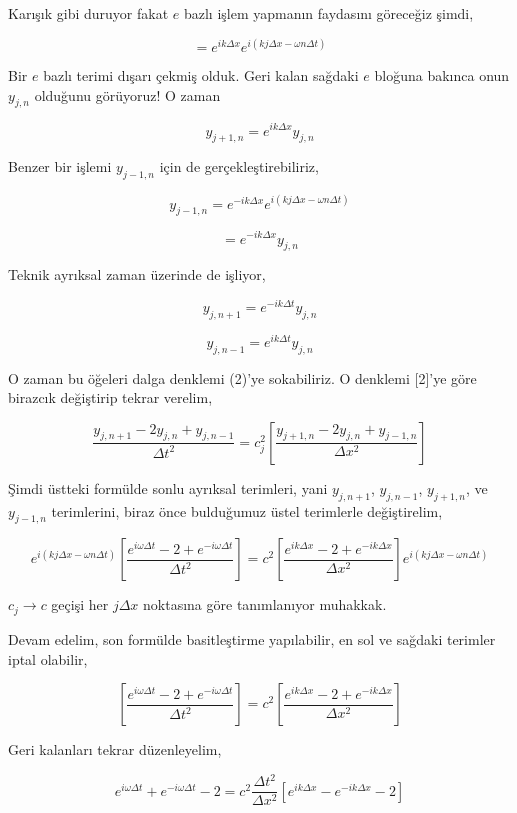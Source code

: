 \documentclass[12pt,fleqn]{article}\usepackage{../../common}
\begin{document}
Karışık gibi duruyor fakat $e$ bazlı işlem yapmanın faydasını göreceğiz şimdi,

$$
= e^{i k \Delta x} e^{i(k j \Delta x - \omega n \Delta t)}
$$

Bir $e$ bazlı terimi dışarı çekmiş olduk. Geri kalan sağdaki $e$ bloğuna bakınca
onun $y_{j,n}$ olduğunu görüyoruz! O zaman 

$$
y_{j+1,n} = e^{i k \Delta x} y_{j,n}
$$

Benzer bir işlemi $y_{j-1,n}$ için de gerçekleştirebiliriz, 

$$
y_{j-1,n} = e^{-i k \Delta x} e^{i(k j \Delta x - \omega n \Delta t)}
$$

$$
 = e^{-i k \Delta x} y_{j,n}
$$

Teknik ayrıksal zaman üzerinde de işliyor,

$$
y_{j,n+1}  = e^{-i k \Delta t} y_{j,n}
$$

$$
y_{j,n-1}  = e^{i k \Delta t} y_{j,n}
$$

O zaman bu öğeleri dalga denklemi (2)'ye sokabiliriz. O denklemi [2]'ye göre
birazcık değiştirip tekrar verelim,

$$
\frac{y_{j,n+1} - 2 y_{j,n} + y_{j,n-1} }{\Delta t^2} =
c_j^2 \left[ \frac{ y_{j+1,n} - 2 y_{j,n} + y_{j-1,n} }{\Delta x^2}  \right]
$$

Şimdi üstteki formülde sonlu ayrıksal terimleri, yani $y_{j,n+1}$, $y_{j,n-1}$,
$y_{j+1,n}$, ve $y_{j-1,n}$ terimlerini, biraz önce bulduğumuz üstel terimlerle
değiştirelim,

$$
e^{i(k j \Delta x - \omega n \Delta t)} \left[
\frac{ e^{i\omega \Delta t} - 2  + e^{-i\omega \Delta t}  }
     {\Delta t^2}\right] =
c^2 \left[
\frac{e^{ik\Delta x} - 2 + e^{-ik\Delta x}}
     {\Delta x^2}
\right] e^{i(k j \Delta x - \omega n \Delta t)}
$$

$c_j \to c$ geçişi her $j \Delta x$ noktasına göre tanımlanıyor muhakkak.

Devam edelim, son formülde basitleştirme yapılabilir, en sol ve sağdaki terimler
iptal olabilir,

$$
\left[
\frac{ e^{i\omega \Delta t} - 2  + e^{-i\omega \Delta t}  }
     {\Delta t^2}\right] =
c^2 \left[
\frac{e^{ik\Delta x} - 2 + e^{-ik\Delta x}}
     {\Delta x^2}
\right]
$$

Geri kalanları tekrar düzenleyelim,

$$
e^{i\omega \Delta t} + e^{-i\omega \Delta t} - 2 =
c^2 \frac{\Delta t^2}{\Delta x^2} [ e^{ik\Delta x} - e^{-ik\Delta x} - 2]
$$
\end{document}
